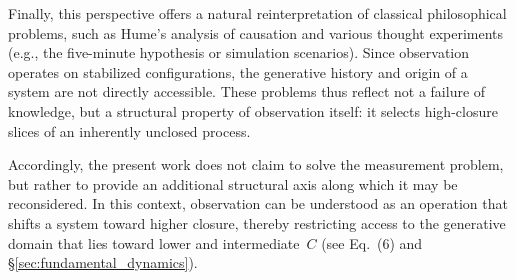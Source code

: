 Finally, this perspective offers a natural reinterpretation of classical philosophical problems,
such as Hume's analysis of causation and various thought experiments (e.g., the five-minute
hypothesis or simulation scenarios).
Since observation operates on stabilized configurations, the generative history and origin of a
system are not directly accessible.
These problems thus reflect not a failure of knowledge, but a structural property of observation
itself: it selects high-closure slices of an inherently unclosed process.

Accordingly, the present work does not claim to solve the measurement problem, but rather to
provide an additional structural axis along which it may be reconsidered.
In this context, observation can be understood as an operation that shifts a system toward higher
closure, thereby restricting access to the generative domain that lies toward lower and
intermediate~$C$ (see Eq.~(6) and \S\ref{sec:fundamental_dynamics}).
